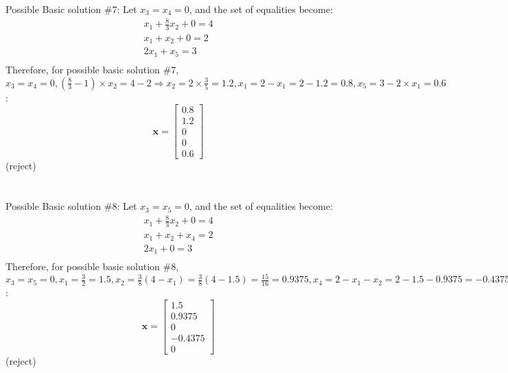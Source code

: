 \documentclass[letter,12pt]{article}
\begin{document}
Possible Basic solution \#7:
Let $x_{3} = x_{4} = 0$, and the set of equalities become:
\begin{eqnarray*}
x_{1} + \frac{8}{3}x_{2} + 0 = 4 \\
x_{1} + x_{2} + 0 = 2 \\
2x_{1} + x_{5} = 3 \\
\end{eqnarray*}
Therefore, for possible basic solution \#7, $x_{3} = x_{4} = 0, (\frac{8}{3} - 1) \times x_{2} = 4 - 2 \Rightarrow x_{2} = 2 \times \frac{3}{5} = 1.2, x_{1} = 2 - x_{1} = 2 - 1.2 = 0.8, x_{5} = 3 - 2 \times x_{1} = 0.6$:
\begin{equation}
\mathbf{x} = \left[
	\begin{array}{c}
	0.8 \\ 1.2 \\ 0 \\ 0 \\ 0.6
	\end{array}
	\right]
\end{equation}
(reject) \\
\ \\
\ \\

Possible Basic solution \#8:
Let $x_{3} = x_{5} = 0$, and the set of equalities become:
\begin{eqnarray*}
x_{1} + \frac{8}{3}x_{2} + 0 = 4 \\
x_{1} + x_{2} + x_{4} = 2 \\
2x_{1} + 0 = 3 \\
\end{eqnarray*}
Therefore, for possible basic solution \#8, $x_{3} = x_{5} = 0, x_{1} = \frac{3}{2} = 1.5, x_{2} = \frac{3}{8}(4 - x_{1}) = \frac{3}{8}(4 - 1.5) = \frac{15}{16} = 0.9375, x_{4} = 2 - x_{1} - x_{2} = 2 - 1.5 - 0.9375 = -0.4375$:
\begin{equation}
\mathbf{x} = \left[
	\begin{array}{c}
	1.5 \\ 0.9375 \\ 0 \\ -0.4375 \\ 0
	\end{array}
	\right]
\end{equation}
(reject) \\
\ \\
\ \\
\end{document}
